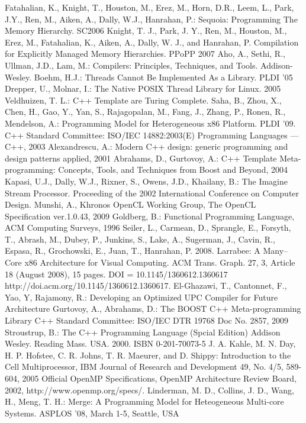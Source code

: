 \documentclass[10pt, conference, compsocconf]{IEEEtran}
\begin{document}
\begin{thebibliography}{99}
\setlength{\itemsep}{1mm}
 Fatahalian, K., Knight, T., Houston, M., Erez, M., Horn, D.R., Leem, L., Park, J.Y., Ren, M., Aiken, A., Dally, W.J., Hanrahan, P.: Sequoia: Programming The Memory Hierarchy. SC2006
 Knight, T. J., Park, J. Y., Ren, M., Houston, M., Erez, M., Fatahalian, K., Aiken, A., Dally, W. J., and Hanrahan, P. Compilation for Explicitly Managed Memory Hierarchies. PPoPP 2007
 Aho, A., Sethi, R., Ullman, J.D., Lam, M.: Compilers: Principles, Techniques, and Tools. Addison-Wesley. 
 Boehm, H.J.: Threads Cannot Be Implemented As a Library. PLDI '05
 Drepper, U., Molnar, I.: The Native POSIX Thread Library for Linux. 2005
 Veldhuizen, T. L.: C++ Template are Turing Complete. 
 Saha, B., Zhou, X., Chen, H., Gao, Y., Yan, S., Rajagopalan, M., Fang, J., Zhang, P., Ronen, R., Mendelson, A.: Programming Model for Heterogeneous x86 Platform. PLDI '09.
 C++ Standard Committee: ISO/IEC 14882:2003(E) Programming Languages — C++, 2003
 Alexandrescu, A.: Modern C++ design: generic programming and design patterns applied, 2001
 Abrahams, D., Gurtovoy, A.: C++ Template Meta-programming: Concepts, Tools, and Techniques from Boost and Beyond, 2004
 Kapasi, U.J., Dally, W.J., Rixner, S., Owens, J.D., Khailany, B.: The Imagine Stream Processor. Proceeding of the 2002 International Conference on Computer Design.
 Munshi, A., Khronos OpenCL Working Group, The OpenCL Specification ver.1.0.43, 2009
 Goldberg, B.: Functional Programming Language, ACM Computing Surveys, 1996
 Seiler, L., Carmean, D., Sprangle, E., Forsyth, T., Abrash, M., Dubey, P., Junkins, S., Lake, A., Sugerman, J., Cavin, R., Espasa, R., Grochowski, E., Juan, T., Hanrahan, P. 2008. Larrabee: A Many–Core x86 Architecture for Visual Computing. ACM Trans. Graph. 27, 3, Article 18 (August 2008), 15 pages. DOI = 10.1145/1360612.1360617 http://doi.acm.org/10.1145/1360612.1360617. 
 El-Ghazawi, T., Cantonnet, F., Yao, Y, Rajamony, R.: Developing an Optimized UPC Compiler for Future Architecture
 Gurtovoy, A., Abrahams, D.: The BOOST C++ Meta-programming Library
 C++ Standard Committee: ISO/IEC DTR 19768 Doc No. 2857, 2009
 Stroustrup, B.: The C++ Programming Language (Spcial Edition) Addison Wesley. Reading Mass. USA. 2000. ISBN 0-201-70073-5
 J. A. Kahle, M. N. Day, H. P. Hofstee, C. R. Johns, T. R. Maeurer, and D. Shippy: Introduction to the Cell Multiprocessor, IBM Journal of Research and Development 49, No. 4/5, 589-604, 2005
 Official OpenMP Specifications, OpenMP Architecture
  Review Board, 2002, http://www.openmp.org/specs/.
Linderman, M. D., Collins, J. D., Wang, H., Meng, T. H.:
  Merge: A Programming Model for Heteogeneous Multi-core Systems. ASPLOS '08, March 1-5, Seattle, USA
\end{thebibliography}




\end{document}
